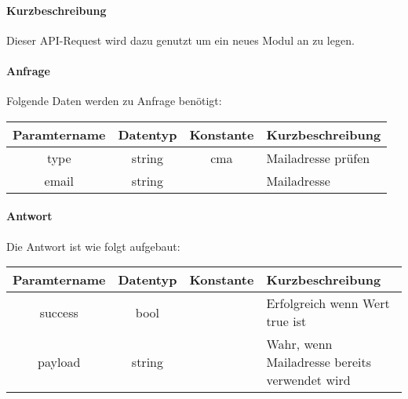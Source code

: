 \paragraph{Kurzbeschreibung}Dieser API-Request wird dazu genutzt um ein neues Modul an zu legen.
\paragraph{Anfrage}Folgende Daten werden zu Anfrage benötigt:
\begin{table}[H]
	\begin{tabular}{|c|c|c|p{6.5cm}|}
		\hline
		\textbf{Paramtername} & \textbf{Datentyp} & \textbf{Konstante} & \textbf{Kurzbeschreibung}                                                                                               \\ \hline
		type                & string            & cma                & Mailadresse prüfen \\ \hline
		email               & string            &                    & Mailadresse \\ \hline
	\end{tabular}
\end{table}
\paragraph{Antwort}Die Antwort ist wie folgt aufgebaut:
\begin{table}[H]
	\begin{tabular}{|c|c|c|p{6.5cm}|}
		\hline
		\textbf{Paramtername} & \textbf{Datentyp} & \textbf{Konstante} & \textbf{Kurzbeschreibung}            \\ \hline                
		success             & bool             &                 & Erfolgreich wenn Wert {\glqq true\grqq} ist \\ \hline
		payload             & string           &                 & Wahr, wenn Mailadresse bereits verwendet wird \\ \hline
	\end{tabular}
\end{table}